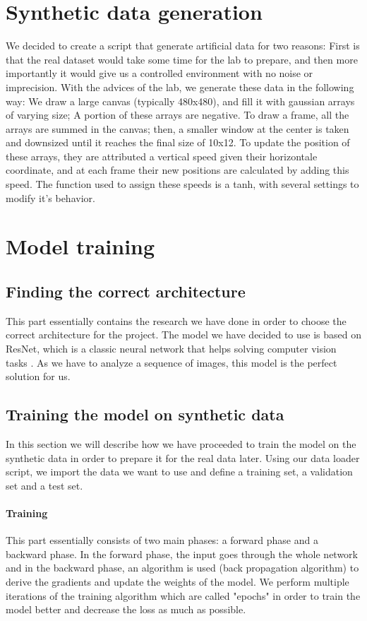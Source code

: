 \documentclass[10pt,conference,compsocconf]{IEEEtran}
\begin{document}
\section{Synthetic data generation}
We decided to create a script that generate artificial data for two reasons: First is that the real dataset would take some time for the lab to prepare, and then more importantly it would give us a controlled environment with no noise or imprecision. 
With the advices of the lab, we generate these data in the following way: We draw a large canvas (typically 480x480), and fill it with gaussian arrays of varying size; A portion of these arrays are negative. To draw a frame, all the arrays are summed in the canvas; then, a smaller window at the center is taken and downsized until it reaches the final size of 10x12.
To update the position of these arrays, they are attributed a vertical speed given their horizontale coordinate, and at each frame their new positions are calculated by adding this speed. The function used to assign these speeds is a tanh, with several settings to modify it's behavior. 

\section{Model training}
\subsection{Finding the correct architecture}
This part essentially contains the research we have done in order to choose the correct architecture for the project. The model we have decided to use is based on ResNet, which is a classic neural network that helps solving computer vision tasks \cite{hara3dcnns}. As we have to analyze a sequence of images, this model is the perfect solution for us.

\subsection{Training the model on synthetic data}
In this section we will describe how we have proceeded to train the model on the synthetic data in order to prepare it for the real data later. Using our data loader script, we import the data we want to use and define a training set, a validation set and a test set.
\paragraph{Training} This part essentially consists of two main phases: a forward phase and a backward phase. In the forward phase, the input goes through the whole network and in the backward phase, an algorithm is used (back propagation algorithm) to derive the gradients and update the weights of the model. We perform multiple iterations of the training algorithm which are called "epochs" in order to train the model better and decrease the loss as much as possible.
\end{document}
